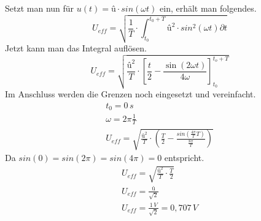             Setzt man nun für $ u(t) = û\cdot sin(\omega t)$ ein, erhält man folgendes.
            \begin{equation}
                U_{eff}=\sqrt{\frac{1}{T}\cdot\int_{t_0}^{t_0+T} û^2\cdot sin^2(\omega t)\partial t}
            \end{equation}
            Jetzt kann man das Integral auflösen.
            \begin{equation}
                U_{eff}=\sqrt{\frac{û^2}{T}\cdot\left[\frac{t}{2} - \frac{\sin(2\omega t)}{4\omega}\right]_{t_0}^{t_o+T}}
                \label{ansatz}
            \end{equation}
            Im Anschluss werden die Grenzen noch eingesetzt und vereinfacht. 
            \begin{gather}
                t_0 = 0\, s\\
                \omega = 2\pi\frac{1}{T}\\
                U_{eff}=\sqrt{\frac{û^2}{T}\cdot\left(\frac{T}{2}-\frac{sin\left(\frac{4\pi}{T} T\right)}{\frac{8\pi}{T}}\right)}
            \end{gather}
            Da $sin(0) = sin(2\pi) = sin(4\pi) = 0$ entspricht. 
            \begin{gather}
                U_{eff}=\sqrt{\frac{û^2}{T}\cdot\frac{T}{2}}\\
                U_{eff}=\frac{û}{\sqrt{2}}\\
                U_{eff}=\frac{1\, V}{\sqrt{2}} = 0,707\, V
            \end{gather}
